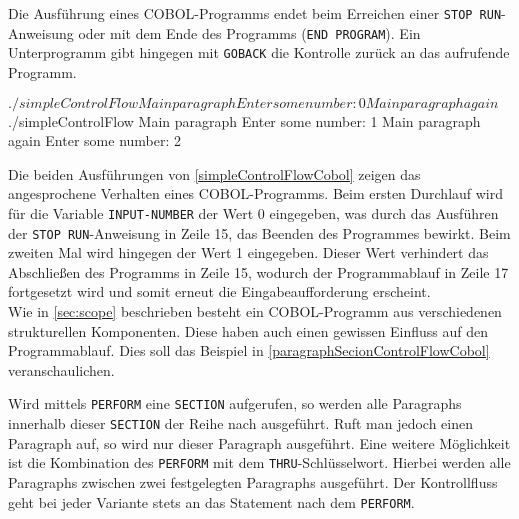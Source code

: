 Die Ausführung eines COBOL-Programms endet beim Erreichen einer \texttt{STOP RUN}-Anweisung oder mit dem Ende des Programms (\texttt{END PROGRAM}). Ein Unterprogramm gibt hingegen mit \texttt{GOBACK} die Kontrolle zurück an das aufrufende Programm.\\

\sepCodeAndOutputCheck
\begin{shellwindow}
$ ./simpleControlFlow 
Main paragraph
Enter some number: 0
Main paragraph again
$ ./simpleControlFlow 
Main paragraph
Enter some number: 1 
Main paragraph again
Enter some number: 2
\end{shellwindow}

Die beiden Ausführungen von \autoref{simpleControlFlowCobol} zeigen das angesprochene Verhalten eines COBOL-Programms. Beim ersten Durchlauf wird für die Variable \texttt{INPUT-NUMBER} der Wert 0 eingegeben, was durch das Ausführen der \texttt{STOP RUN}-Anweisung in Zeile 15, das Beenden des Programmes bewirkt. Beim zweiten Mal wird hingegen der Wert 1 eingegeben. Dieser Wert verhindert das Abschließen des Programms in Zeile 15, wodurch der Programmablauf in Zeile 17 fortgesetzt wird und somit erneut die Eingabeaufforderung erscheint.\\

Wie in \autoref{sec:scope} beschrieben besteht ein COBOL-Programm aus verschiedenen strukturellen Komponenten. Diese haben auch einen gewissen Einfluss auf den Programmablauf. Dies soll das Beispiel in \autoref{paragraphSecionControlFlowCobol} veranschaulichen.\\

\sepCodeAndOutputCheck
{}

Wird mittels \texttt{PERFORM} eine \texttt{SECTION} aufgerufen, so werden alle Paragraphs innerhalb dieser \texttt{SECTION} der Reihe nach ausgeführt. Ruft man jedoch einen Paragraph auf, so wird nur dieser Paragraph ausgeführt. Eine weitere Möglichkeit ist die Kombination des \texttt{PERFORM} mit dem \texttt{THRU}-Schlüsselwort. Hierbei werden alle Paragraphs zwischen zwei festgelegten Paragraphs ausgeführt. Der Kontrollfluss geht bei jeder Variante stets an das Statement nach dem \texttt{PERFORM}. \\


